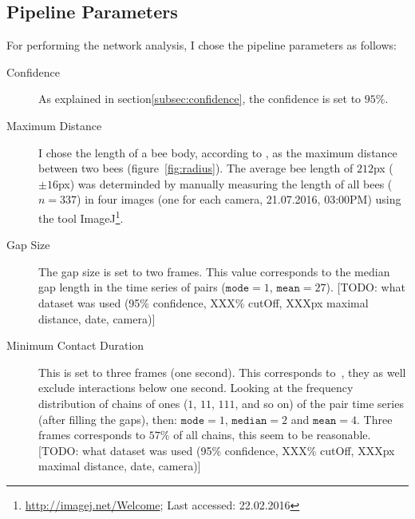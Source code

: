 \subsection{Pipeline Parameters}
For performing the network analysis, I chose the pipeline parameters as follows:

\begin{description}
\item[Confidence] As explained in section\ref{subsec:confidence}, the confidence is set to $95\%$.

\item[Maximum Distance] I chose the length of a bee body, according to \textcite{baracchi2014socio}, as the maximum distance between two bees (figure~\ref{fig:radius}). The average bee length of $212$px ($\pm 16$px)  was determinded by manually measuring the length of all bees ($n=337$) in four images (one for each camera, 21.07.2016, 03:00PM) using the tool ImageJ\footnote{\url{http://imagej.net/Welcome}; Last accessed: 22.02.2016}.

\item[Gap Size] The gap size is set to two frames. This value corresponds to the median gap length in the time series of pairs ($\texttt{mode}=1$, $\texttt{mean}=27$). [TODO: what dataset was used (95\% confidence, XXX\% cutOff, XXXpx maximal distance, date, camera)]

\item[Minimum Contact Duration] This is set to three frames (one second). This corresponds to~\textcite{mersch2013tracking}, they as well exclude interactions below one second. Looking at the frequency distribution of chains of ones ($1$, $11$, $111$, and so on) of the pair time series (after filling the gaps), then: $\texttt{mode}=1$, $\texttt{median}=2$ and $\texttt{mean}=4$. Three frames corresponds to $57\%$ of all chains, this seem to be reasonable. [TODO: what dataset was used (95\% confidence, XXX\% cutOff, XXXpx maximal distance, date, camera)]

\end{description}

